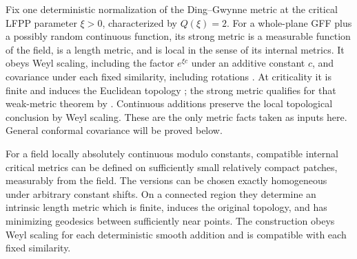 Fix one deterministic normalization of the Ding--Gwynne metric at the
critical LFPP parameter $\xi>0$, characterized by $Q(\xi)=2$.  For a
whole-plane GFF plus a possibly random continuous function, its strong metric
is a measurable function of the field, is a length metric, and is local in
the sense of its internal metrics.  It obeys Weyl scaling, including the
factor $e^{\xi c}$ under an additive constant $c$, and covariance under each
fixed similarity, including rotations
\cite[Definition 1.7, Theorem 1.8, and Proposition 1.9]{DGuniqueness}.
At criticality it is finite and induces the Euclidean topology
\cite[Theorem 1.7]{DGtopology}; the strong metric qualifies for that weak-metric
theorem by \cite[Lemma 1.14]{DGuniqueness}.  Continuous additions preserve
the local topological conclusion by Weyl scaling.  These are the only
metric facts taken as inputs here.  General conformal covariance will be
proved below.

\begin{lemma}\label{cont:local-metric}
For a field locally absolutely continuous modulo constants, compatible
internal critical metrics can be defined on sufficiently small relatively
compact patches, measurably from the field.  The versions can be chosen
exactly homogeneous under arbitrary constant shifts.  On a connected region
they determine an intrinsic length metric which is finite, induces the
original topology, and has minimizing geodesics between sufficiently near
points.  The construction obeys Weyl scaling for each deterministic smooth
addition and is compatible with each fixed similarity.
\end{lemma}

